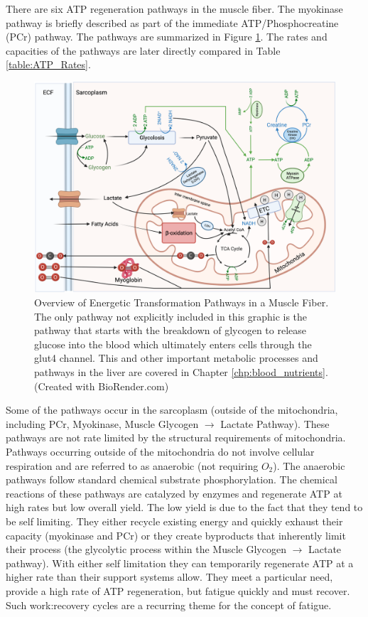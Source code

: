 There are six ATP regeneration pathways in the muscle fiber. The myokinase pathway is briefly described as part of the immediate ATP/Phosphocreatine (PCr) pathway. The pathways are summarized in Figure \ref{fig:Energetics_Overview}. The rates and capacities of the pathways are later directly compared in Table \ref{table:ATP_Rates}. 


\begin{figure}[!h]
    \centering
    \includegraphics[width=1\linewidth]{./figure/Energetics_Overview.png}
    \caption{Overview of Energetic Transformation Pathways in a Muscle Fiber. The only pathway not explicitly included in this graphic is the pathway that starts with the breakdown of glycogen to release glucose into the blood which ultimately enters cells through the glut4 channel. This and other important metabolic processes and pathways in the liver are covered in Chapter \ref{chp:blood_nutrients}. (\footnotesize{Created with BioRender.com})}
    \label{fig:Energetics_Overview}
\end{figure}

Some of the pathways occur in the sarcoplasm (outside of the mitochondria, including PCr, Myokinase, Muscle Glycogen $\rightarrow$ Lactate Pathway). These pathways are not rate limited by the structural requirements of mitochondria.  Pathways occurring outside of the mitochondria do not involve cellular respiration and are referred to as anaerobic (not requiring $O_2$). The anaerobic pathways follow standard chemical substrate phosphorylation. The chemical reactions of these pathways are catalyzed by enzymes and regenerate ATP at high rates but low overall yield. The low yield is due to the fact that they tend to be self limiting. They either recycle existing energy and quickly exhaust their capacity (myokinase and PCr) or they create byproducts that inherently limit their process (the glycolytic process within the Muscle Glycogen $\rightarrow$ Lactate pathway). With either self limitation they can temporarily regenerate ATP at a higher rate than their support systems allow. They meet a particular need, provide a high rate of ATP regeneration, but fatigue quickly and must recover. Such work:recovery cycles are a recurring theme for the concept of fatigue.

